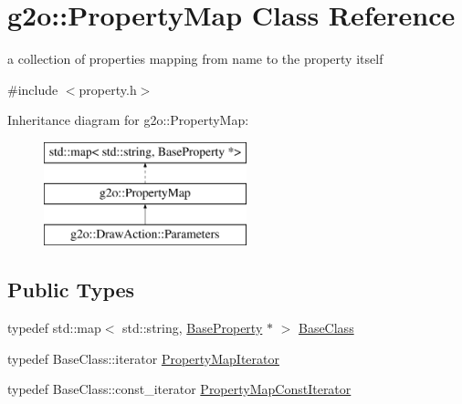 \hypertarget{classg2o_1_1_property_map}{}\section{g2o\+:\+:Property\+Map Class Reference}
\label{classg2o_1_1_property_map}


a collection of properties mapping from name to the property itself  




{\ttfamily \#include $<$property.\+h$>$}

Inheritance diagram for g2o\+:\+:Property\+Map\+:\begin{figure}[H]
\begin{center}
\leavevmode
\includegraphics[height=3.000000cm]{classg2o_1_1_property_map}
\end{center}
\end{figure}
\subsection*{Public Types}
\begin{DoxyCompactItemize}
\item 
typedef std\+::map$<$ std\+::string, \mbox{\hyperlink{classg2o_1_1_base_property}{Base\+Property}} $\ast$ $>$ \mbox{\hyperlink{classg2o_1_1_property_map_ac57ddbe51d16070e697fe314889fee03}{Base\+Class}}
\item 
typedef Base\+Class\+::iterator \mbox{\hyperlink{classg2o_1_1_property_map_af5dd0defe4a5096f0d5602b38e837a78}{Property\+Map\+Iterator}}
\item 
typedef Base\+Class\+::const\+\_\+iterator \mbox{\hyperlink{classg2o_1_1_property_map_af09ea140ab099b1762e9634b7fdcaf52}{Property\+Map\+Const\+Iterator}}
\end{DoxyCompactItemize}
